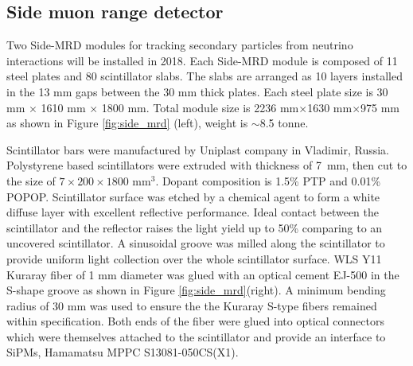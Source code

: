 \subsection{Side muon range detector}
Two Side-MRD modules for tracking secondary particles from neutrino interactions will be installed in 2018. 
Each Side-MRD module is composed of 11 steel plates and 80 scintillator slabs. 
The slabs are arranged as 10 layers installed in the 13 mm gaps between the
30 mm thick plates. 
Each steel plate size is 30 mm $\times$ 1610 mm $\times$ 1800 mm.
Total module size  is  2236 mm$\times$1630 mm$\times$975 mm as shown in Figure \ref{fig:side_mrd} (left), weight is $\sim$8.5 tonne. 

Scintillator bars were manufactured by Uniplast company in Vladimir, Russia. Polystyrene based scintillators were extruded with thickness of 7~mm, then cut to the size of $7\times200\times1800$ mm$^{3}$. Dopant composition is  1.5\% PTP and 0.01\% POPOP.
Scintillator surface was etched by a chemical agent to form a white diffuse layer with excellent reflective performance. 
Ideal contact between the scintillator and the reflector raises the light yield up to 50\% comparing to an uncovered scintillator. 
A sinusoidal groove was milled along the scintillator to provide uniform light collection over the whole scintillator surface. 
WLS Y11 Kuraray fiber of 1 mm diameter was glued with an optical cement EJ-500 in the S-shape groove  as shown in Figure \ref{fig:side_mrd}(right). 
A minimum bending radius of 30 mm was used to ensure the the Kuraray S-type fibers remained within specification.
Both ends of the fiber were glued into optical connectors which were themselves attached to the scintillator and provide an interface to SiPMs, Hamamatsu  MPPC S13081-050CS(X1). 


